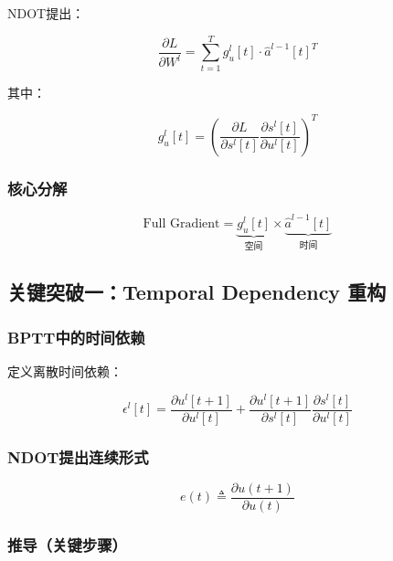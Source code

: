 \documentclass[journal,12pt,onecolumn]{IEEEtran}
\begin{document}
NDOT提出：

\begin{equation}
\frac{\partial L}{\partial W^l}
=
\sum_{t=1}^{T}
g_u^l[t] \cdot \hat{a}^{l-1}[t]^T
\end{equation}

其中：

\begin{equation}
g_u^l[t] =
\left(
\frac{\partial L}{\partial s^l[t]}
\frac{\partial s^l[t]}{\partial u^l[t]}
\right)^T
\end{equation}



\subsubsection{核心分解}

\begin{equation}
\text{Full Gradient} =
\underbrace{g_u^l[t]}_{\text{空间}}
\times
\underbrace{\hat{a}^{l-1}[t]}_{\text{时间}}
\end{equation}



\subsection{关键突破一：Temporal Dependency 重构}

\subsubsection{BPTT中的时间依赖}

定义离散时间依赖：

\begin{equation}
\epsilon^l[t]
=
\frac{\partial u^l[t+1]}{\partial u^l[t]}
+
\frac{\partial u^l[t+1]}{\partial s^l[t]}
\frac{\partial s^l[t]}{\partial u^l[t]}
\end{equation}



\subsubsection{NDOT提出连续形式}

\begin{equation}
e(t) \triangleq \frac{\partial u(t+1)}{\partial u(t)}
\end{equation}



\subsubsection{推导（关键步骤）}
\end{document}
